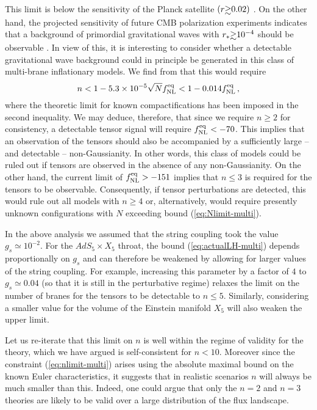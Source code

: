 This limit is below the sensitivity of the Planck satellite 
$(r \gsim 0.02 )$ \cite{planck}. On the other hand, 
the projected sensitivity of future CMB polarization experiments 
indicates that a background of primordial 
gravitational waves with $r_* \gsim 10^{-4}$ 
should be observable \cite{songknox,vpj, Baumann:2008aq}. In view of this, 
it is interesting to consider whether
a detectable gravitational wave background could in principle 
be generated in this class of multi-brane inflationary 
models. We find from  that this would require 
% 
\begin{equation}
\label{eq:nlimit-multi}
n < 1 -5.3 \times 10^{-5} \sqrt{N} f_{\mathrm{NL}}^{\mathrm{eq}} < 1-0.014 f_{\mathrm{NL}}^{\mathrm{eq}} \,,
\end{equation}
% 
where the theoretic limit  for 
known compactifications has been imposed in the 
second inequality. We may deduce, therefore, that  
since we require $n \ge 2$ for consistency, a detectable tensor 
signal will require $f_{\mathrm{NL}}^{\mathrm{eq}} < -70$. This implies that an observation of 
the tensors should also be 
accompanied by a sufficiently large -- and detectable -- non-Gaussianity. 
In other words, this class of models could  
be ruled out if tensors are observed in the absence of any
non-Gaussianity. On the other hand, the current 
limit of  $f_{\mathrm{NL}}^{\mathrm{eq}} >-151$ implies that $n \le 3$ is required 
for the tensors to be observable. 
Consequently, if tensor perturbations are detected, this would rule 
out all models with $n \ge  4$ or, alternatively, would require presently 
unknown configurations with $N$ exceeding bound (\ref{eq:Nlimit-multi}). 


In the above analysis we assumed that the string coupling 
took the value $g_s \simeq 10^{-2}$. For the $AdS_5 \times X_5$ throat, 
the bound (\ref{eq:actualLH-multi}) depends proportionally on $g_s$ and can 
therefore be weakened by allowing for larger values of the string coupling. 
For example, increasing this parameter by a factor of $4$ 
to $g_s \simeq 0.04$ (so that it is still in the perturbative regime)
relaxes the limit on the number of branes for the tensors to be detectable to 
$n \le 5$. Similarly, considering a smaller value for the 
volume of the Einstein manifold $X_5$ will also weaken the upper limit. 


Let us re-iterate that this limit on $n$ is well within the 
regime of validity for the theory, which we have argued is 
self-consistent for $n<10$. Moreover since the constraint (\ref{eq:nlimit-multi})
arises using the absolute maximal bound on the known 
Euler characteristics, it suggests that in realistic scenarios $n$ will 
always be much smaller than this. Indeed, one could argue that 
only the $n=2$ and $n=3$ theories are
likely to be valid over a large distribution of the flux landscape. 


